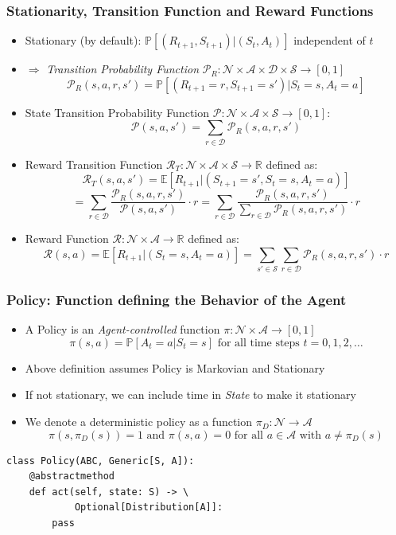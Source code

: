 \documentclass[handout]{beamer}
\begin{document}
\begin{frame}
\frametitle{Stationarity, Transition Function and Reward Functions}
\pause
\begin{itemize}[<+->]
\item Stationary (by default): $\mathbb{P}[(R_{t+1}, S_{t+1}) | (S_t, A_t)]$ independent of $t$
\item $\Rightarrow$ {\em Transition Probability Function} $\mathcal{P}_R: \mathcal{N} \times \mathcal{A} \times \mathcal{D} \times \mathcal{S} \rightarrow [0,1]$
$$\mathcal{P}_R(s,a,r,s') = \mathbb{P}[(R_{t+1}=r, S_{t+1}=s') | S_t=s, A_t = a]$$
\item State Transition Probability Function $\mathcal{P}: \mathcal{N} \times \mathcal{A} \times \mathcal{S} \rightarrow [0,1]$:
$$\mathcal{P}(s, a, s') = \sum_{r\in \mathcal{D}} \mathcal{P}_R(s, a, r, s')$$
\item Reward Transition Function $\mathcal{R}_T: \mathcal{N} \times \mathcal{A} \times \mathcal{S} \rightarrow \mathbb{R}$ defined as:
$$\mathcal{R}_T(s,a,s') = \mathbb{E}[R_{t+1}|(S_{t+1}=s',S_t=s,A_t=a)]$$
$$ = \sum_{r\in \mathcal{D}} \frac {\mathcal{P}_R(s,a,r,s')} {\mathcal{P}(s,a,s')} \cdot r = \sum_{r\in \mathcal{D}} \frac {\mathcal{P}_R(s,a,r,s')} {\sum_{r\in \mathcal{D}} \mathcal{P}_R(s,a,r,s')} \cdot r$$
\item Reward Function $\mathcal{R}: \mathcal{N} \times \mathcal{A} \rightarrow \mathbb{R}$ defined as:
$$\mathcal{R}(s,a) = \mathbb{E}[R_{t+1}|(S_t=s, A_t=a)] = \sum_{s'\in \mathcal{S}} \sum_{r\in\mathcal{D}} \mathcal{P}_R(s,a,r,s') \cdot r$$
\end{itemize}
\end{frame}

\begin{frame}[fragile]
\frametitle{Policy: Function defining the Behavior of the Agent}
\pause
\begin{itemize}[<+->]
\item A Policy is an {\em Agent-controlled} function $\pi: \mathcal{N} \times \mathcal{A} \rightarrow [0,1]$
$$\pi(s, a) = \mathbb{P}[A_t = a|S_t = s] \text{ for all time steps } t = 0, 1, 2, \ldots$$
\item Above definition assumes Policy is Markovian and Stationary
\item If not stationary, we can include time in {\em State} to make it stationary
\item We denote a deterministic policy as a function $\pi_D: \mathcal{N} \rightarrow \mathcal{A}$
$$\pi(s, \pi_D(s)) = 1 \text{ and } \pi(s, a) = 0 \text{ for all } a\in \mathcal{A} \text{ with } a \neq \pi_D(s)$$
\end{itemize}
\pause
\begin{lstlisting}
class Policy(ABC, Generic[S, A]):
    @abstractmethod
    def act(self, state: S) -> \
            Optional[Distribution[A]]:
        pass
\end{lstlisting}
\end{frame}
\end{document}
